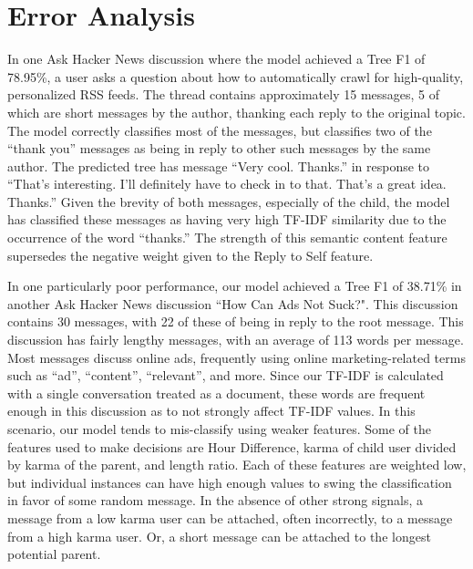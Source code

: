 \documentclass{article}
\begin{document}
\section{Error Analysis}
In one Ask Hacker News discussion where the model achieved a Tree F1 of 78.95\%,
a user asks a question about how to automatically crawl for high-quality, 
personalized RSS feeds. The thread contains approximately 15 messages, 5 of 
which are short messages by the author, thanking each reply to the original 
topic. The model correctly classifies most of the messages, but classifies two 
of the ``thank you'' messages as being in reply to other such messages by the 
same author. The predicted tree has message ``Very cool. Thanks.'' in response 
to ``That's interesting. I'll definitely have to check in to that. That's a 
great idea. Thanks.'' Given the brevity of both messages, especially of the 
child, the model has classified these messages as having very high TF-IDF 
similarity due to the occurrence of the word ``thanks.'' The strength of this 
semantic content feature supersedes the negative weight given to the Reply to 
Self feature.

In one particularly poor performance, our model achieved a Tree F1 of 38.71\% 
in another Ask Hacker News discussion ``How Can Ads Not Suck?". This 
discussion contains 30 messages, with 22 of these of being in reply to the 
root message. This discussion has fairly lengthy messages, with an average of 
113 words per message. Most messages discuss online ads, frequently using 
online marketing-related terms such as ``ad'', ``content'', ``relevant'', and 
more. Since our TF-IDF is calculated with a single conversation treated as a 
document, these words are frequent enough in this discussion as to not 
strongly affect TF-IDF values. In this scenario, our model tends to 
mis-classify using weaker features. Some of the features used to make decisions 
are Hour Difference, karma of child user divided by karma of the parent, and 
length ratio. Each of these features are weighted low, but individual 
instances can have high enough values to swing the classification in favor of 
some random message. In the absence of other strong signals, a message from a 
low karma user can be attached, often incorrectly, to a message from a high 
karma user. Or, a short message can be attached to the longest potential parent.
\end{document}
